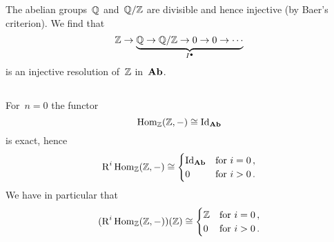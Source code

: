 \section{}





\subsection{}

The abelian groups~$\mathbb{Q}$ and~$\mathbb{Q}/\mathbb{Z}$ are divisible and hence injective (by Baer’s criterion).
We find that
\[
  \mathbb{Z}
  \to
  \underbrace{
  \mathbb{Q}
  \to
  \mathbb{Q}/\mathbb{Z}
  \to
  0
  \to
  0
  \to
  \dotsb
  }_{I^\bullet}
\]
is an injective resolution of~$\mathbb{Z}$ in~$\mathbf{Ab}$.





\subsection{}

For~$n = 0$ the functor
\[
  \operatorname{Hom}_{\mathbb{Z}}(\mathbb{Z}, -)
  \cong
  \mathrm{Id}_{\mathbf{Ab}}
\]
is exact, hence
\[
  \operatorname{R}^i \operatorname{Hom}_{\mathbb{Z}}(\mathbb{Z}, -)
  \cong
  \begin{cases}
    \mathrm{Id}_{\mathbf{Ab}} & \text{for~$i = 0$}  \,, \\
    0         & \text{for~$i > 0$}  \,.
  \end{cases}
\]
We have in particular that
\[
  ( \operatorname{R}^i \operatorname{Hom}_{\mathbb{Z}}(\mathbb{Z}, -) )(\mathbb{Z})
  \cong
  \begin{cases}
    \mathbb{Z}  & \text{for~$i = 0$}  \,, \\
    0         & \text{for~$i > 0$}  \,.
  \end{cases}
\]

